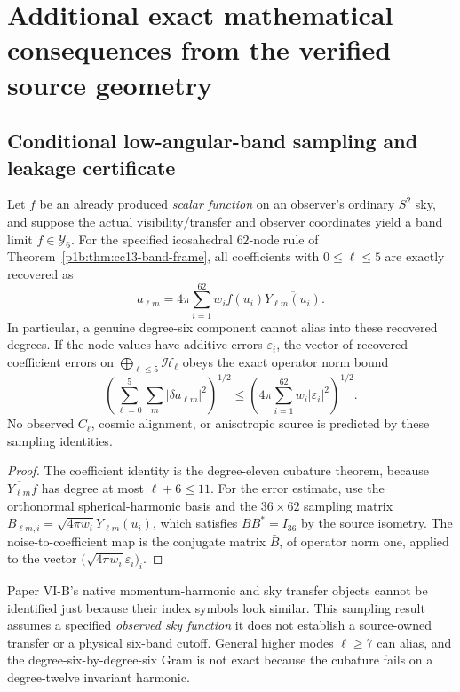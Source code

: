\documentclass[12pt,a4paper]{article}
\begin{document}
\section{Additional exact mathematical consequences from the verified source geometry}

\subsection{Conditional low-angular-band sampling and leakage certificate}
\label{p6b:sec:cc13-lowell-sampling}

\begin{corollary}
\label{p6b:cor:cc13-sky-sampling}
Let $f$ be an already produced \emph{scalar function} on an observer's
ordinary $S^2$ sky, and suppose the actual visibility/transfer and
observer coordinates yield a band limit $f\in\mathscr Y_6$.
For the specified icosahedral $62$-node rule of
Theorem~\ref{p1b:thm:cc13-band-frame}, all coefficients with
$0\le\ell\le5$ are exactly recovered as
\[
 \boxed{a_{\ell m}=4\pi\sum_{i=1}^{62}
 w_i f(u_i)\overline{Y_{\ell m}(u_i)}.}
\]
In particular, a genuine degree-six component cannot alias into
these recovered degrees.  If the node values have additive errors
$\varepsilon_i$, the vector of recovered coefficient errors on
$\bigoplus_{\ell\le5}\mathscr H_\ell$ obeys the exact operator
norm bound
\[
 \boxed{\left(\sum_{\ell=0}^5\sum_m
 |\delta a_{\ell m}|^2\right)^{1/2}
 \le\left(4\pi\sum_{i=1}^{62}w_i|\varepsilon_i|^2\right)^{1/2}.}
\]
No observed $C_\ell$, cosmic alignment, or anisotropic source is
predicted by these sampling identities.
\end{corollary}
\begin{proof}
The coefficient identity is the degree-eleven cubature theorem,
because $\overline{Y_{\ell m}}f$ has degree at most $\ell+6\le11$.
For the error estimate, use the orthonormal spherical-harmonic
basis and the $36\times62$ sampling matrix
$B_{\ell m,i}=\sqrt{4\pi w_i}Y_{\ell m}(u_i)$,
which satisfies $BB^*=I_{36}$ by the source isometry.
The noise-to-coefficient map is the conjugate matrix $\bar B$,
of operator norm one, applied to the vector
$\big(\sqrt{4\pi w_i}\varepsilon_i\big)_i$.
\end{proof}

\begin{remark}
Paper VI-B's native momentum-harmonic and sky transfer objects cannot
be identified just because their index symbols look similar.  This
sampling result assumes a specified \emph{observed sky function}\;
it does not establish a source-owned transfer or a physical six-band cutoff.  General higher modes $\ell\ge7$ can alias, and
the degree-six-by-degree-six Gram is not exact because the cubature
fails on a degree-twelve invariant harmonic.
\end{remark}
\end{document}
